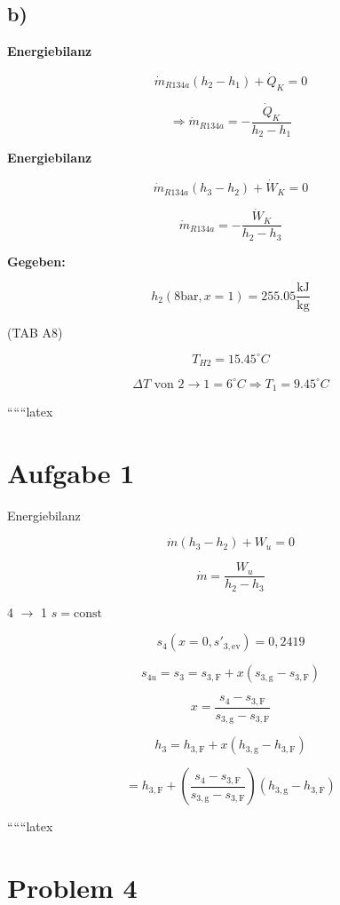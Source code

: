 

\subsection*{b)}

\textbf{Energiebilanz}

\[
\dot{m}_{R134a} (h_2 - h_1) + \dot{Q}_K = 0
\]

\[
\Rightarrow \dot{m}_{R134a} = - \frac{\dot{Q}_K}{h_2 - h_1}
\]

\textbf{Energiebilanz}

\[
\dot{m}_{R134a} (h_3 - h_2) + \dot{W}_K = 0
\]

\[
\dot{m}_{R134a} = - \frac{\dot{W}_K}{h_2 - h_3}
\]

\textbf{Gegeben:}

\[
h_2 (8 \text{bar}, x=1) = 255.05 \frac{\text{kJ}}{\text{kg}}
\]

(TAB A8)

\[
T_{H2} = 15.45^\circ C
\]

\[
\Delta T \text{ von 2} \rightarrow 1 = 6^\circ C \Rightarrow T_1 = 9.45^\circ C
\]

``````latex

\section*{Aufgabe 1}

Energiebilanz

\[
\dot{m} \left( h_3 - h_2 \right) + W_u = 0
\]

\[
\dot{m} = \frac{W_u}{h_2 - h_3}
\]

4 $\rightarrow$ 1 \quad $s = \text{const}$

\[
s_4 (x = 0, s'_{3, \text{ev}}) = 0,2419
\]

\[
s_{4u} = s_3 = s_{3, \text{F}} + x \left( s_{3, \text{g}} - s_{3, \text{F}} \right)
\]

\[
x = \frac{s_4 - s_{3, \text{F}}}{s_{3, \text{g}} - s_{3, \text{F}}}
\]

\[
h_3 = h_{3, \text{F}} + x \left( h_{3, \text{g}} - h_{3, \text{F}} \right)
\]

\[
= h_{3, \text{F}} + \left( \frac{s_4 - s_{3, \text{F}}}{s_{3, \text{g}} - s_{3, \text{F}}} \right) \left( h_{3, \text{g}} - h_{3, \text{F}} \right)
\]

``````latex


\section*{Problem 4}